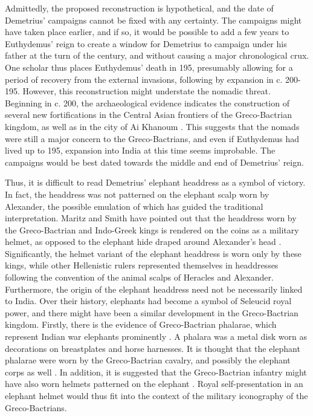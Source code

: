 \documentclass{ijsra}
\begin{document}
Admittedly, the proposed reconstruction is hypothetical, and the date of Demetrius’ campaigns cannot be fixed with any certainty.
The campaigns might have taken place earlier, and if so, it would be possible to add a few years to Euthydemus’ reign
to create a window for Demetrius to campaign under his father at the turn of the century,
and without causing a major chronological crux.
One scholar thus places Euthydemus’ death in 195\BC, presumably allowing for a period of recovery from the external invasions,
following by expansion in c. 200-195\BC \parencite[111]{Hollis2011}.
However, this reconstruction might understate the nomadic threat.
Beginning in c. 200\BC, the archaeological evidence indicates the construction of several new fortifications in the Central Asian
frontiers of the Greco-Bactrian kingdom, as well as in the city of Ai Khanoum \parencite[135]{Holt1999}.
This suggests that the nomads were still a major concern to the Greco-Bactrians, and even if Euthydemus had lived up to 195\BC,
expansion into India at this time seems improbable.
The campaigns would be best dated towards the middle and end of Demetrius’ reign.

Thus, it is difficult to read Demetrius’ elephant headdress as a symbol of victory.
In fact, the headdress was not patterned on the elephant scalp worn by Alexander,
the possible emulation of which has guided the traditional interpretation.
Maritz and Smith have pointed out that the headdress worn by the Greco-Bactrian and Indo-Greek kings is rendered on the coins
as a military helmet, as opposed to the elephant hide draped around Alexander’s head \parencites[48]{Maritz2004}[63]{Smith1986}.
Significantly, the helmet variant of the elephant headdress is worn only by these kings, while other Hellenistic rulers
represented themselves in headdresses following the convention of the animal scalps of Heracles and Alexander.
Furthermore, the origin of the elephant headdress need not be necessarily linked to India.
Over their history, elephants had become a symbol of Seleucid royal power, and there might have been a similar development in
the Greco-Bactrian kingdom.
Firstly, there is the evidence of Greco-Bactrian phalarae, which represent Indian war elephants prominently \parencite[1206--1211]{Bannikov2013}.
A phalara was a metal disk worn as decorations on breastplates and horse harnesses.
It is thought that the elephant phalarae were worn by the Greco-Bactrian cavalry, and possibly the elephant corps as well 
\parencites[1206--1211]{Bannikov2013}[10]{Pfrommer 1993}[588]{Treister 1999}.
In addition, it is suggested that the Greco-Bactrian infantry might have also worn helmets patterned on the elephant \parencite[163--180]{Abdullaev1995}.
Royal self-presentation in an elephant helmet would thus fit into the context of the military iconography of the Greco-Bactrians.
\end{document}
